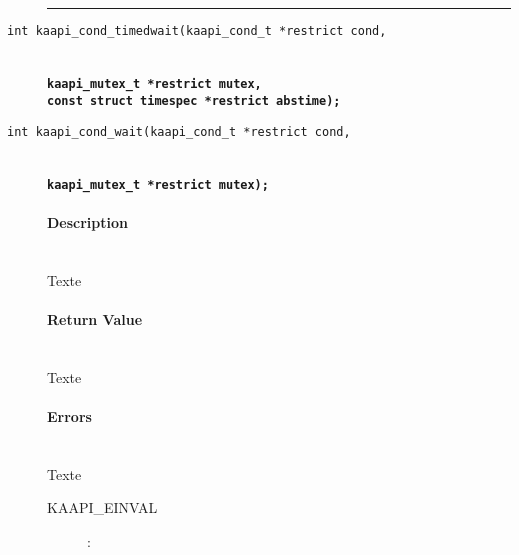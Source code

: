\begin{description}
\vspace*{3ex} \hrule width 4cm
\vspace*{3ex} 
\item [\texttt{int kaapi\_cond\_timedwait(kaapi\_cond\_t *restrict cond,}]~\\
\textbf{\texttt{kaapi\_mutex\_t *restrict mutex,}}~\\
\textbf{\texttt{const struct timespec *restrict abstime);}}
\item [\texttt{int kaapi\_cond\_wait(kaapi\_cond\_t *restrict cond,}]~\\
\textbf{\texttt{kaapi\_mutex\_t *restrict mutex);}}~\\

\paragraph{Description}~\\
Texte

\paragraph{Return Value}~\\
Texte

\paragraph{Errors}~\\
Texte

\begin{description}
\item [KAAPI\_EINVAL]: 
\end{description}

\end{description}


